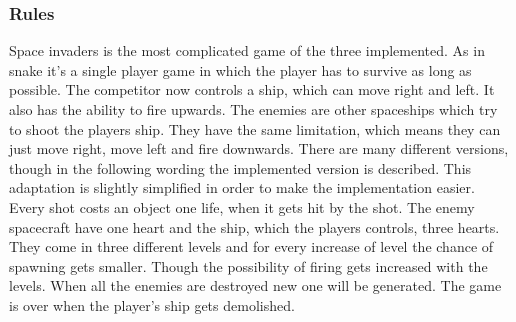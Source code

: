 \documentclass[12pt]{article}
\begin{document}
\subsubsection{Rules}
Space invaders is the most complicated game of the three implemented. As in snake it's a single player game in which the player has to survive as long as possible. The competitor now controls a ship, which can move right and left. It also has the ability to fire upwards. The enemies are other spaceships which try to shoot the players ship. They have the same limitation, which means they can just move right, move left and fire downwards. There are many different versions, though in the following wording the implemented version is described. This adaptation is slightly simplified in order to make the implementation easier. Every shot costs an object one life, when it gets hit by the shot. The enemy spacecraft have one heart and the ship, which the players controls, three hearts. They come in three different levels and for every increase of level the chance of spawning gets smaller. Though the possibility of firing gets increased with the levels. When all the enemies are destroyed new one will be generated. The game is over when the player's ship gets demolished.
\end{document}
